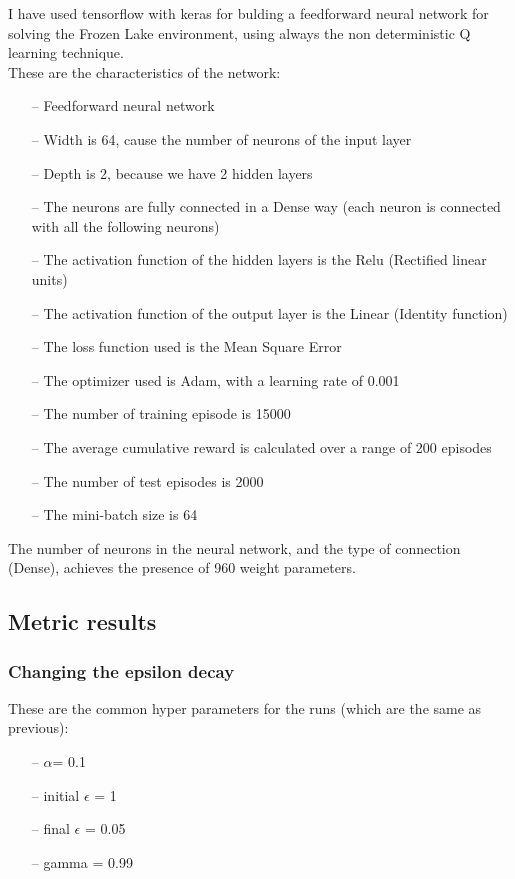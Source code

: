 \documentclass{article}
\begin{document}
I have used tensorflow with keras for bulding a feedforward neural network for solving the Frozen Lake environment, using always the non deterministic Q learning technique.
\\
These are the characteristics of the network:
\begin{itemize}
\item[--] Feedforward neural network
\item[--] Width is 64, cause the number of neurons of the input layer
\item[--] Depth is 2, because we have 2 hidden layers
\item[--] The neurons are fully connected in a Dense way (each neuron is connected with all the following neurons)
\item[--] The activation function of the hidden layers is the Relu (Rectified linear units)
\item[--] The activation function of the output layer is the Linear (Identity function)
\item[--] The loss function used is the Mean Square Error
\item[--] The optimizer used is Adam, with a learning rate of 0.001
\item[--] The number of training episode is 15000
\item[--] The average cumulative reward is calculated over a range of 200 episodes
\item[--] The number of test episodes is 2000
\item[--] The mini-batch size is 64
\end{itemize}





The number of neurons in the neural network, and the type of connection (Dense), achieves the presence of 960 weight parameters.

\subsection{Metric results}


\subsubsection{Changing the epsilon decay}


These are the common hyper parameters for the runs (which are the same as previous):
\begin{itemize}
\item[--] $\alpha$= 0.1
\item[--] initial $\epsilon$ = 1
\item[--] final $\epsilon$ = 0.05
\item[--] gamma = 0.99
\end{itemize}
\end{document}
